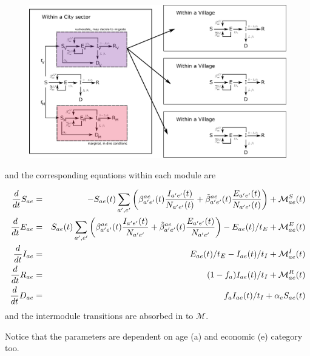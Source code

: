 \documentclass{article}
\begin{document}
\begin{figure}[H]
	\centering
	\includegraphics[width=\textwidth]{scheme2-network}
\end{figure}


and the corresponding equations within each module are

\begin{eqnarray}
\frac{d}{dt} S_{ae} &=& - S_{ae}(t) \sum_{a',e'} \bigg( \beta^{ae}_{a'e'}(t) \frac{I_{a'e'}(t)}{N_{a'e'}(t)} + \tilde{\beta}^{ae}_{a'e'}(t) \frac{E_{a'e'}(t)}{N_{a'e'}(t)} \bigg) + \mathcal{M}^{S}_{ae}(t)\\
\frac{d}{dt} E_{ae} &=& S_{ae}(t) \sum_{a',e'} \bigg( \beta^{ae}_{a'e'}(t) \frac{I_{a'e'}(t)}{N_{a'e'}} + \tilde{\beta}^{ae}_{a'e'}(t) \frac{E_{a'e'}(t)}{N_{a'e'}} \bigg) - E_{ae}(t)/t_E + \mathcal{M}^{E}_{ae}(t)\\
\frac{d}{dt} I_{ae} &=& E_{ae}(t)/t_E - I_{ae}(t)/t_I + \mathcal{M}^{I}_{ae}(t)\\     
\frac{d}{dt} R_{ae} &=& (1- f_{a}) I_{ae}(t)/t_I  + \mathcal{M}^{R}_{ae}(t)\\
\frac{d}{dt} D_{ae} &=& f_{a} I_{ae}(t)/t_I + \alpha_e S_{ae}(t)
\end{eqnarray}
and the intermodule transitions are absorbed in to $\mathcal{M}$. 

Notice that the parameters are dependent on age (a) and economic (e) category too.
\end{document}
